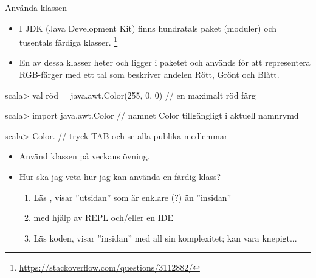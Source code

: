 \begin{Slide}{Använda klassen }\SlideFontSmall
\begin{itemize}
\item I JDK (Java Development Kit) finns hundratals paket (moduler) och tusentals färdiga klasser.
\footnote{\SlideFontTiny\url{https://stackoverflow.com/questions/3112882/}}

\item En av dessa klasser heter  och ligger i paketet  och används för att representera RGB-färger med ett tal som beskriver andelen Rött, Grönt och Blått.
\end{itemize}
\begin{REPL}
scala> val röd = java.awt.Color(255, 0, 0)    //  en maximalt röd färg

scala> import java.awt.Color  // namnet Color tillgängligt i aktuell namnrymd

scala> Color.    // tryck TAB och se alla publika medlemmar
\end{REPL}
\pause
\begin{itemize}
\item Använd klassen  på veckans övning.
\item Hur ska jag veta hur jag kan använda en färdig klass?
\pause
\begin{enumerate}\SlideFontTiny
  \item Läs , visar ''utsidan'' som är enklare (?) än ''insidan''
  \item {} med hjälp av REPL och/eller en IDE
  \item Läs koden, visar ''insidan'' med all sin komplexitet; kan vara knepigt...
\end{enumerate}
\end{itemize}

\end{Slide}



